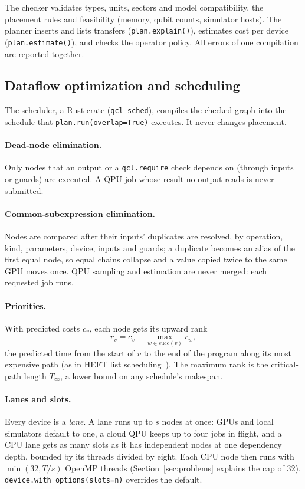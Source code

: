 \documentclass[10pt]{article}
\newcommand{\code}[1]{\texttt{#1}}
\begin{document}
The checker validates types, units, sectors and model compatibility, the placement rules
and feasibility (memory, qubit counts, simulator hosts). The planner inserts and lists
transfers (\code{plan.explain()}), estimates cost per device (\code{plan.estimate()}),
and checks the operator policy. All errors of one compilation are reported together.

\subsection{Dataflow optimization and scheduling}
\label{sec:sched}

The scheduler, a Rust crate (\code{qcl-sched}), compiles the checked graph into the
schedule that \code{plan.run(overlap=True)} executes. It never changes placement.

\paragraph{Dead-node elimination.} Only nodes that an output or a \code{qcl.require}
check depends on (through inputs or guards) are executed. A QPU job whose result no
output reads is never submitted.

\paragraph{Common-subexpression elimination.} Nodes are compared after their inputs'
duplicates are resolved, by operation, kind, parameters, device, inputs and guards;
a duplicate becomes an alias of the first equal node, so equal chains collapse and a
value copied twice to the same GPU moves once. QPU sampling and estimation are never
merged: each requested job runs.

\paragraph{Priorities.} With predicted costs $c_v$, each node gets its upward rank
\[
  r_v = c_v + \max_{w \in \mathrm{succ}(v)} r_w ,
\]
the predicted time from the start of $v$ to the end of the program along its most
expensive path (as in HEFT list scheduling~\cite{heft}). The maximum rank is the
critical-path length $T_\infty$, a lower bound on any schedule's makespan.

\paragraph{Lanes and slots.} Every device is a \emph{lane}. A lane runs up to $s$ nodes
at once: GPUs and local simulators default to one, a cloud QPU keeps up to four jobs in
flight, and a CPU lane gets as many slots as it has independent nodes at one dependency
depth, bounded by its threads divided by eight. Each CPU node then runs with
$\min(32, T/s)$ OpenMP threads (Section~\ref{sec:problems} explains the cap of 32).
\code{device.with\_options(slots=n)} overrides the default.
\end{document}
